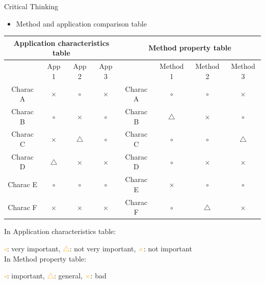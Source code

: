 \documentclass[
 size=14pt,
 paper=smartboard,  %
 mode=present, 		%
 display=slides, 	%
 style=tuliplab,  	%
 pauseslide,
 fleqn,leqno]{powerdot}{}
\begin{document}
\begin{slide}[toc=,bm=]{Critical Thinking}

\begin{itemize}
  \item Method and application comparison table
\end{itemize}


\begin{tabular}{|c|c|c|c|c|c|c|c|}
\hline
\multicolumn{4}{|c|}{Application characteristics table} & \multicolumn{4}{|c|}{Method property table} \\
\hline
        & App 1   & App 2   & App 3 &             & Method 1  & Method 2  & Method 3\\
\hline
Charac A& $\times$  &  $\circ$  &  $\times$ & Charac A  &   $\circ$ & $\circ$   & $\times$  \\
\hline
Charac B&  $\circ$  &  $\times$ & $\circ$   & Charac B  &   $\bigtriangleup$ & $\times$  & $\circ$  \\
\hline
Charac C&  $\times$ & $\bigtriangleup$  & $\circ$   & Charac C  &   $\circ$ & $\circ$    & $\bigtriangleup$  \\
\hline
Charac D& $\bigtriangleup$ & $\times$  & $\times$   & Charac D  &  $\circ$  & $\times$   & $\times$  \\
\hline
Charac E& $\circ$  &  $\circ$  & $\circ$    & Charac E  &  $\times$ &  $\circ$   &  $\circ$   \\
\hline
Charac F&  $\times$ & $\times$ & $\times$    & Charac F  &    $\circ$  & $\bigtriangleup$  &  $\times$  \\
\hline
\hline
\end{tabular}

\vspace{0.5cm}
In Application characteristics table:

\textcolor{orange}{$\circ$}: very important,
\textcolor{orange}{$\bigtriangleup$}: not very important,
\textcolor{orange}{$\times$}: not important \\

\vspace{0.5cm}
In Method property table:

\textcolor{orange}{$\circ$}: important,
\textcolor{orange}{$\bigtriangleup$}: general,
\textcolor{orange}{$\times$}: bad

\end{slide}
\end{document}

